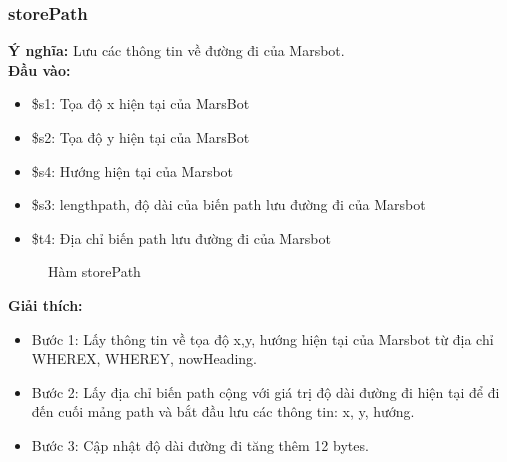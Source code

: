 \documentclass[a4paper,12pt]{article}
\begin{document}
	\subsubsection{storePath}
	    \textbf{Ý nghĩa:} Lưu các thông tin về đường đi của Marsbot.\\
	    \textbf{Đầu vào:} 
	    \begin{itemize}
            \item \$s1: Tọa độ x hiện tại của MarsBot
            \item \$s2: Tọa độ y hiện tại của MarsBot
            \item \$s4: Hướng hiện tại của Marsbot
            \item \$s3: lengthpath, độ dài của biến path lưu đường đi của Marsbot
            \item \$t4: Địa chỉ biến path lưu đường đi của Marsbot
        \end{itemize}
        \FloatBarrier
        \begin{figure}[ht!]
    	    \centerline{}
    	    \caption{Hàm storePath}
    	    \label{fig:bai100}
        \end{figure}
        \clearpage
        \noindent
	    \textbf{Giải thích:}
	        \begin{itemize}
	            \item Bước 1: Lấy thông tin về tọa độ x,y, hướng hiện tại của Marsbot từ địa chỉ WHEREX, WHEREY, nowHeading.
	            \item Bước 2: Lấy địa chỉ biến path cộng với giá trị độ dài đường đi hiện tại để đi đến cuối mảng path và bắt đầu lưu các thông tin: x, y, hướng. 
	            \item Bước 3: Cập nhật độ dài đường đi tăng thêm 12 bytes.
	        \end{itemize}	
\end{document}
